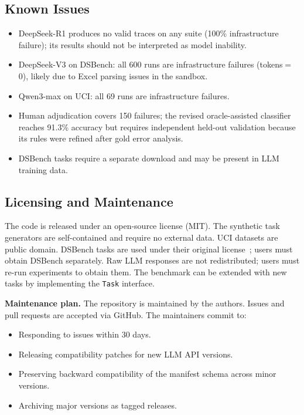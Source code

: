 \subsection{Known Issues}

\begin{itemize}[leftmargin=*,itemsep=1pt]
\item DeepSeek-R1 produces no valid traces on any suite (100\% infrastructure failure); its results should not be interpreted as model inability.
\item DeepSeek-V3 on DSBench: all 600 runs are infrastructure failures (tokens$=$0), likely due to Excel parsing issues in the sandbox.
\item Qwen3-max on UCI: all 69 runs are infrastructure failures.
\item Human adjudication covers 150 failures; the revised oracle-assisted classifier reaches 91.3\% accuracy but requires independent held-out validation because its rules were refined after gold error analysis.
\item DSBench tasks require a separate download and may be present in LLM training data.
\end{itemize}

\subsection{Licensing and Maintenance}

The code is released under an open-source license (MIT). The synthetic task generators are self-contained and require no external data. UCI datasets are public domain. DSBench tasks are used under their original license~\citep{jing2024dsbench}; users must obtain DSBench separately. Raw LLM responses are not redistributed; users must re-run experiments to obtain them. The benchmark can be extended with new tasks by implementing the \texttt{Task} interface.

\textbf{Maintenance plan.} The repository is maintained by the authors. Issues and pull requests are accepted via GitHub. The maintainers commit to:
\begin{itemize}[leftmargin=*,itemsep=1pt]
\item Responding to issues within 30 days.
\item Releasing compatibility patches for new LLM API versions.
\item Preserving backward compatibility of the manifest schema across minor versions.
\item Archiving major versions as tagged releases.
\end{itemize}

